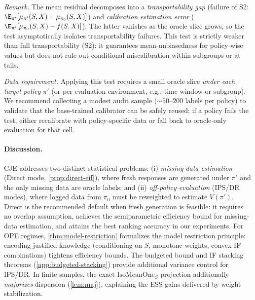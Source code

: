 \noindent
\emph{Remark.} The mean residual decomposes into a \emph{transportability gap} (failure of S2: $\E_{\pi'}[\mu_{\pi'}(S,X) - \mu_{\pi_0}(S,X)]$) and \emph{calibration estimation error} ($\E_{\pi'}[\mu_{\pi_0}(S,X) - f(S,X)]$). The latter vanishes as the oracle slice grows, so the test asymptotically isolates transportability failures. This test is strictly weaker than full transportability (S2): it guarantees mean-unbiasedness for policy-wise values but does not rule out conditional miscalibration within subgroups or at tails.

\noindent
\emph{Data requirement.} Applying this test requires a small oracle slice \emph{under each target policy $\pi'$} (or per evaluation environment, e.g., time window or subgroup). We recommend collecting a modest audit sample (${\sim}50$--$200$ labels per policy) to validate that the base-trained calibrator can be safely reused; if a policy fails the test, either recalibrate with policy-specific data or fall back to oracle-only evaluation for that cell.

\paragraph{Discussion.}
CJE addresses two distinct statistical problems: (i) \emph{missing-data estimation} (Direct mode, \cref{prop:direct-eif}), where fresh responses are generated under $\pi'$ and the only missing data are oracle labels; and (ii) \emph{off-policy evaluation} (IPS/DR modes), where logged data from $\pi_0$ must be reweighted to estimate $V(\pi')$.
Direct is the recommended default when fresh generation is feasible: it requires no overlap assumption, achieves the semiparametric efficiency bound for missing-data estimation, and attains the best ranking accuracy in our experiments.
For OPE regimes, \cref{thm:model-restriction} formalizes the model restriction principle: encoding justified knowledge (conditioning on $S$, monotone weights, convex IF combinations) tightens efficiency bounds. The budgeted bound and IF stacking theorems (\cref{app:budgeted-stacking}) provide additional variance control for IPS/DR.
In finite samples, the exact $\mathrm{IsoMeanOne}_S$ projection additionally \emph{majorizes} dispersion (\cref{lem:maj}), explaining the ESS gains delivered by weight stabilization.

